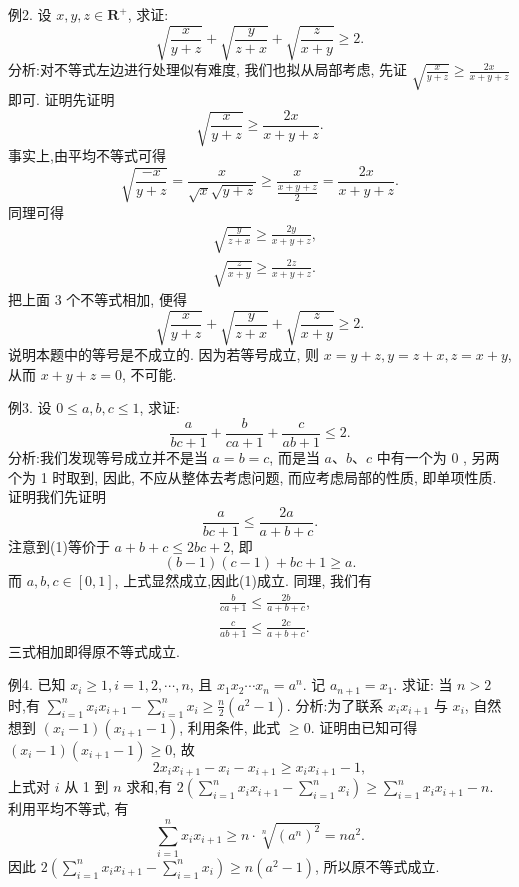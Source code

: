 例2. 设 $x, y, z \in \mathbf{R}^{+}$, 求证:
$$
\sqrt{\frac{x}{y+z}}+\sqrt{\frac{y}{z+x}}+\sqrt{\frac{z}{x+y}} \geqslant 2 .
$$
分析:对不等式左边进行处理似有难度, 我们也拟从局部考虑, 先证 $\sqrt{\frac{x}{y+z}} \geqslant \frac{2 x}{x+y+z}$ 即可.
证明先证明
$$
\sqrt{\frac{x}{y+z}} \geqslant \frac{2 x}{x+y+z} .
$$
事实上,由平均不等式可得
$$
\sqrt{\frac{-x}{y+z}}=\frac{x}{\sqrt{x} \sqrt{y+z}} \geqslant \frac{x}{\frac{x+y+z}{2}}=\frac{2 x}{x+y+z} .
$$
同理可得
$$
\begin{aligned}
& \sqrt{\frac{y}{z+x}} \geqslant \frac{2 y}{x+y+z}, \\
& \sqrt{\frac{z}{x+y}} \geqslant \frac{2 z}{x+y+z} .
\end{aligned}
$$
把上面 3 个不等式相加, 便得
$$
\sqrt{\frac{x}{y+z}}+\sqrt{\frac{y}{z+x}}+\sqrt{\frac{z}{x+y}} \geqslant 2 .
$$
说明本题中的等号是不成立的.
因为若等号成立, 则 $x=y+z, y= z+x, z=x+y$, 从而 $x+y+z=0$, 不可能.



例3. 设 $0 \leqslant a, b, c \leqslant 1$, 求证:
$$
\frac{a}{b c+1}+\frac{b}{c a+1}+\frac{c}{a b+1} \leqslant 2 .
$$
分析:我们发现等号成立并不是当 $a=b=c$, 而是当 $a 、 b 、 c$ 中有一个为 0 , 另两个为 1 时取到, 因此, 不应从整体去考虑问题, 而应考虑局部的性质, 即单项性质.
证明我们先证明
$$
\frac{a}{b c+1} \leqslant \frac{2 a}{a+b+c} . \label{(1)}
$$
注意到(1)等价于 $a+b+c \leqslant 2 b c+2$, 即
$$
(b-1)(c-1)+b c+1 \geqslant a .
$$
而 $a, b, c \in[0,1]$, 上式显然成立,因此(1)成立.
同理, 我们有
$$
\begin{aligned}
& \frac{b}{c a+1} \leqslant \frac{2 b}{a+b+c}, \label{(2)} \\
& \frac{c}{a b+1} \leqslant \frac{2 c}{a+b+c} . \label{(3)}
\end{aligned}
$$
三式相加即得原不等式成立.



例4. 已知 $x_i \geqslant 1, i=1,2, \cdots, n$, 且 $x_1 x_2 \cdots x_n=a^n$. 记 $a_{n+1}=x_1$. 求证: 当 $n>2$ 时,有 $\sum_{i=1}^n x_i x_{i+1}-\sum_{i=1}^n x_i \geqslant \frac{n}{2}\left(a^2-1\right)$.
分析:为了联系 $x_i x_{i+1}$ 与 $x_i$, 自然想到 $\left(x_i-1\right)\left(x_{i+1}-1\right)$, 利用条件, 此式 $\geqslant 0$.
证明由已知可得 $\left(x_i-1\right)\left(x_{i+1}-1\right) \geqslant 0$, 故
$$
2 x_i x_{i+1}-x_i-x_{i+1} \geqslant x_i x_{i+1}-1,
$$
上式对 $i$ 从 1 到 $n$ 求和,有 $2\left(\sum_{i=1}^n x_i x_{i+1}-\sum_{i=1}^n x_i\right) \geqslant \sum_{i=1}^n x_i x_{i+1}-n$.
利用平均不等式, 有
$$
\sum_{i=1}^n x_i x_{i+1} \geqslant n \cdot \sqrt[n]{\left(a^n\right)^2}=n a^2 .
$$
因此 $2\left(\sum_{i=1}^n x_i x_{i+1}-\sum_{i=1}^n x_i\right) \geqslant n\left(a^2-1\right)$, 所以原不等式成立.



